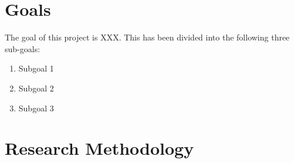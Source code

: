 \section{Goals}


The goal of this project is XXX. This has been divided into the following three sub-goals:
\begin{enumerate}
\item Subgoal 1 %
\item Subgoal 2%
\item Subgoal 3%
\end{enumerate}


\section{Research Methodology}%


